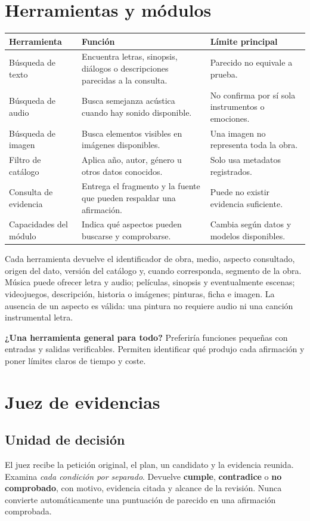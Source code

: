 \documentclass[11pt,a4paper]{article}
\begin{document}
\section{Herramientas y módulos}
\begin{longtable}{p{}p{}p{}}
\textbf{Herramienta} & \textbf{Función} & \textbf{Límite principal}\\\hline
Búsqueda de texto & Encuentra letras, sinopsis, diálogos o descripciones parecidas a la consulta. & Parecido no equivale a prueba.\\
Búsqueda de audio & Busca semejanza acústica cuando hay sonido disponible. & No confirma por sí sola instrumentos o emociones.\\
Búsqueda de imagen & Busca elementos visibles en imágenes disponibles. & Una imagen no representa toda la obra.\\
Filtro de catálogo & Aplica año, autor, género u otros datos conocidos. & Solo usa metadatos registrados.\\
Consulta de evidencia & Entrega el fragmento y la fuente que pueden respaldar una afirmación. & Puede no existir evidencia suficiente.\\
Capacidades del módulo & Indica qué aspectos pueden buscarse y comprobarse. & Cambia según datos y modelos disponibles.\\
\end{longtable}

Cada herramienta devuelve el identificador de obra, medio, aspecto consultado, origen del dato, versión del catálogo y, cuando corresponda, segmento de la obra. Música puede ofrecer letra y audio; películas, sinopsis y eventualmente escenas; videojuegos, descripción, historia o imágenes; pinturas, ficha e imagen. La ausencia de un aspecto es válida: una pintura no requiere audio ni una canción instrumental letra.

\textbf{¿Una herramienta general para todo?} Preferiría funciones pequeñas con entradas y salidas verificables. Permiten identificar qué produjo cada afirmación y poner límites claros de tiempo y coste.

\section{Juez de evidencias}
\subsection{Unidad de decisión}
El juez recibe la petición original, el plan, un candidato y la evidencia reunida. Examina \emph{cada condición por separado}. Devuelve \textbf{cumple}, \textbf{contradice} o \textbf{no comprobado}, con motivo, evidencia citada y alcance de la revisión. Nunca convierte automáticamente una puntuación de parecido en una afirmación comprobada.
\end{document}
